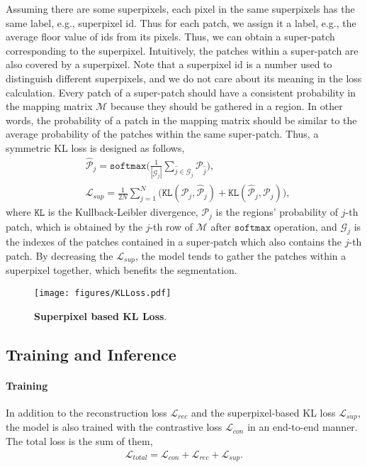 \documentclass{article}
\theoremstyle{plain}
\theoremstyle{definition}
\theoremstyle{remark}
\begin{document}
Assuming there are some superpixels, each pixel in the same superpixels has the same label, e.g., superpixel id. Thus for each patch, we assign it a label, e.g., the average floor value of ids from its pixels. Thus, we can obtain a super-patch corresponding to the superpixel. Intuitively, the patches within a super-patch are also covered by a superpixel. Note that a superpixel id is a number used to distinguish different superpixels, and we do not care about its meaning in the loss calculation. Every patch of a super-patch should have a consistent probability in the mapping matrix $\mathcal{M}$ because they should be gathered in a region. In other words, the probability of a patch in the mapping matrix should be similar to the average probability of the patches within the same super-patch. Thus, a symmetric KL loss is designed as follows,
\begin{align}
    &\hat{\mathcal{P}}_j = \texttt{softmax} \big( \frac{1}{|\mathcal{G}_j|} \sum_{\hat{j} \in \mathcal{G}_j} \mathcal{P}_{\hat{j}} \big), \\
    &\mathcal{L}_{sup} = \frac{1}{2N} \! \sum_{j=1}^{N} \! \big( \texttt{KL}(\mathcal{P}_j, \! \hat{\mathcal{P}}_j) \!+\! \texttt{KL}(\hat{\mathcal{P}}_j, \! \mathcal{P}_j)\big),
\end{align}
where $\texttt{KL}$ is the Kullback-Leibler divergence, $\mathcal{P}_j$ is the regions' probability of $j$-th patch, which is obtained by the $j$-th row of $\mathcal{M}$ after $\texttt{softmax}$ operation, and $\mathcal{G}_j$ is the indexes of the patches contained in a super-patch which also contains the $j$-th patch. By decreasing the $\mathcal{L}_{sup}$, the model tends to gather the patches within a superpixel together, which benefits the segmentation.
\begin{figure}[tp]
    \centering
    \texttt{[image: figures/KLLoss.pdf]}
    \caption{\textbf{Superpixel based KL Loss}.}
    \label{fig:klloss}
\end{figure}

\subsection{Training and Inference}
\paragraph{Training}
In addition to the reconstruction loss $\mathcal{L}_{rec}$ and the superpixel-based KL loss $\mathcal{L}_{sup}$, the model is also trained with the contrastive loss $\mathcal{L}_{con}$ in an end-to-end manner. The total loss is the sum of them,
\begin{align}
    \mathcal{L}_{total} = \mathcal{L}_{con} + \mathcal{L}_{rec} + \mathcal{L}_{sup}.
\end{align}
\end{document}
